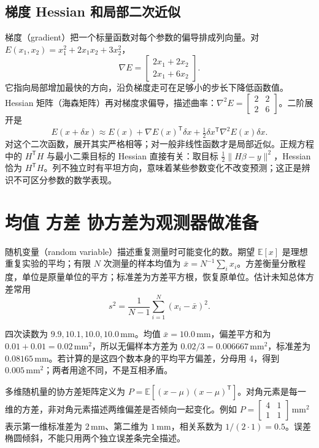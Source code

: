 \subsection{梯度 Hessian 和局部二次近似}
梯度（gradient）把一个标量函数对每个参数的偏导排成列向量。对 $E(x_1,x_2)=x_1^2+2x_1x_2+3x_2^2$，
\[
 \nabla E=\begin{bmatrix}2x_1+2x_2\\2x_1+6x_2\end{bmatrix}.
\]
它指向局部增加最快的方向，沿负梯度走可在足够小的步长下降低函数值。Hessian 矩阵（海森矩阵）再对梯度求偏导，描述曲率：$\nabla^2E=\begin{bmatrix}2&2\\2&6\end{bmatrix}$。二阶展开是
\begin{equation}
 E(x+\delta x)\approx E(x)+\nabla E(x)^\mathsf T\delta x
 +\tfrac12\delta x^\mathsf T\nabla^2E(x)\delta x.
\end{equation}
对这个二次函数，展开其实严格相等；对一般非线性函数才是局部近似。正规方程中的 $H^\mathsf TH$ 与最小二乘目标的 Hessian 直接有关：取目标 $\frac12\|H\beta-y\|^2$，Hessian 恰为 $H^\mathsf TH$。列不独立时有平坦方向，意味着某些参数变化不改变预测；这正是辨识不可区分参数的数学表现。

\section{均值 方差 协方差为观测器做准备}
随机变量（random variable）描述重复测量时可能变化的数。期望 $\mathbb E[x]$ 是理想重复实验的平均；有限 $N$ 次测量的样本均值为 $\bar x=N^{-1}\sum_i x_i$。方差衡量分散程度，单位是原量单位的平方；标准差为方差平方根，恢复原单位。估计未知总体方差常用
\begin{equation}
 s^2=\frac{1}{N-1}\sum_{i=1}^N(x_i-\bar x)^2.
\end{equation}
\begin{examplebox}[算例 位置测量的均值和标准差]
四次读数为 $9.9,10.1,10.0,10.0\,\mathrm{mm}$。均值 $\bar x=10.0\,\mathrm{mm}$，偏差平方和为 $0.01+0.01=0.02\,\mathrm{mm}^2$，所以无偏样本方差为 $0.02/3=0.006667\,\mathrm{mm}^2$，标准差为 $0.08165\,\mathrm{mm}$。若计算的是这四个数本身的平均平方偏差，分母用 4，得到 $0.005\,\mathrm{mm}^2$；两者用途不同，不是互相矛盾。
\end{examplebox}

多维随机量的协方差矩阵定义为 $P=\mathbb E[(x-\mu)(x-\mu)^\mathsf T]$。对角元素是每一维的方差，非对角元素描述两维偏差是否倾向一起变化。例如 $P=\begin{bmatrix}4&1\\1&1\end{bmatrix}\,\mathrm{mm}^2$ 表示第一维标准差为 $2\,\mathrm{mm}$、第二维为 $1\,\mathrm{mm}$，相关系数为 $1/(2\cdot1)=0.5$。误差椭圆倾斜，不能只用两个独立误差条完全描述。

